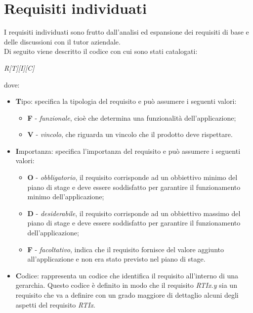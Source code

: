 \begin{figure}[htpb]
\begin{myminipage}{0.40\textwidth}
	\end{myminipage}  
\end{figure}

\newpage
\section{Requisiti individuati}
I requisiti individuati sono frutto dall'analisi ed espansione dei requisiti di base e delle discussioni con il tutor aziendale.\\
Di seguito viene descritto il codice con cui sono stati catalogati:
\begin{center}
	\textit{R[T][I][C]}
\end{center}
dove:
\begin{itemize}
	\item \textbf{T}ipo: specifica la tipologia del requisito e può assumere i seguenti valori:
	\begin{itemize}
		\item \textbf{F} - \textit{funzionale}, cioè che determina una funzionalità dell'applicazione;
		\item \textbf{V} - \textit{vincolo}, che riguarda un vincolo che il prodotto deve rispettare.
	\end{itemize}
	\item \textbf{I}mportanza: specifica l'importanza del requisito e può assumere i seguenti valori:
	\begin{itemize}
		\item \textbf{O} - \textit{obbligatorio}, il requisito corrisponde ad un obbiettivo minimo del piano di stage e deve essere soddisfatto per garantire il funzionamento minimo dell'applicazione;
		\item \textbf{D} - \textit{desiderabile}, il requisito corrisponde ad un obbiettivo massimo del piano di stage e deve essere soddisfatto per garantire il funzionamento dell'applicazione;
		\item \textbf{F} - \textit{facoltativo}, indica che il requisito fornisce del valore aggiunto all'applicazione e non era stato previsto nel piano di stage.
	\end{itemize}
	\item \textbf{C}odice: rappresenta un codice che identifica il requisito all'interno di una gerarchia. Questo codice è definito in modo che il requisito \textit{RTIx.y} sia un requisito che va a definire con un grado maggiore di dettaglio alcuni degli aspetti del requisito \textit{RTIx}.
\end{itemize}

